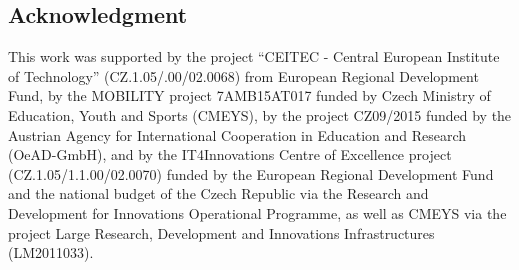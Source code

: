 \documentclass[blues]{poster}
\begin{document}
\begin{multicols}{2}
\vspace{-0.5cm}
\subsection{Acknowledgment} 
This work was supported by the project ``CEITEC - Central European Institute of Technology'' (CZ.1.05/.00/02.0068) from European Regional Development Fund, by the MOBILITY project 7AMB15AT017 funded by Czech Ministry of Education, Youth and Sports (CMEYS), by the project CZ09/2015 funded by the Austrian Agency for International Cooperation in Education and Research (OeAD-GmbH), and by the IT4Innovations Centre of Excellence project (CZ.1.05/1.1.00/02.0070) funded by the European Regional Development Fund and the national budget of the Czech Republic via the Research and Development for Innovations Operational Programme, as well as CMEYS via the project Large Research, Development and Innovations Infrastructures (LM2011033).

\end{multicols}
\end{document}
